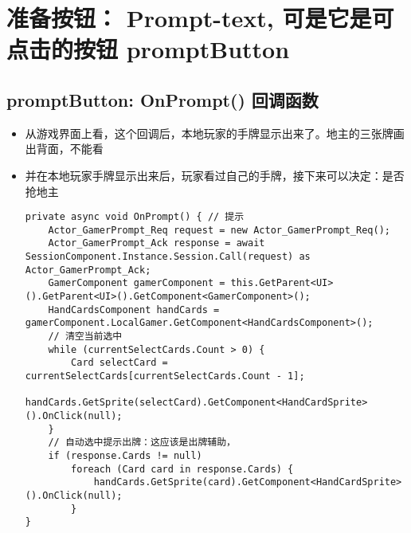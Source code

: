 \documentclass[9pt, b5paper]{article}
\begin{document}
\section{准备按钮： Prompt-text, 可是它是可点击的按钮 promptButton}
\label{sec-2}
\subsection{promptButton: OnPrompt() 回调函数}
\label{sec-2-1}
\begin{itemize}
\item 从游戏界面上看，这个回调后，本地玩家的手牌显示出来了。地主的三张牌画出背面，不能看
\item 并在本地玩家手牌显示出来后，玩家看过自己的手牌，接下来可以决定：是否抢地主
\begin{verbatim}
private async void OnPrompt() { // 提示
    Actor_GamerPrompt_Req request = new Actor_GamerPrompt_Req();
    Actor_GamerPrompt_Ack response = await SessionComponent.Instance.Session.Call(request) as Actor_GamerPrompt_Ack;
    GamerComponent gamerComponent = this.GetParent<UI>().GetParent<UI>().GetComponent<GamerComponent>();
    HandCardsComponent handCards = gamerComponent.LocalGamer.GetComponent<HandCardsComponent>();
    // 清空当前选中
    while (currentSelectCards.Count > 0) {
        Card selectCard = currentSelectCards[currentSelectCards.Count - 1];
        handCards.GetSprite(selectCard).GetComponent<HandCardSprite>().OnClick(null);
    }
    // 自动选中提示出牌：这应该是出牌辅助，
    if (response.Cards != null) 
        foreach (Card card in response.Cards) {
            handCards.GetSprite(card).GetComponent<HandCardSprite>().OnClick(null);
        }
}
\end{verbatim}
\end{itemize}
\end{document}

